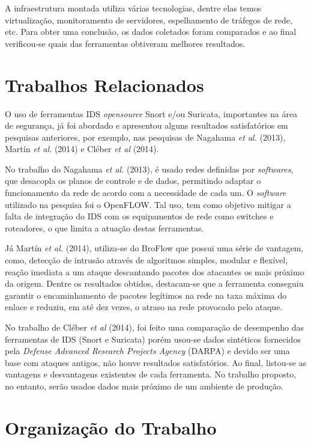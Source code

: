 A infraestrutura montada utiliza várias tecnologias, dentre elas temos virtualização, monitoramento de servidores, espelhamento de tráfegos de rede, etc. Para obter uma conclusão, os dados coletados foram comparados e ao final verificou-se quais das ferramentas obtiveram melhores resultados.

\section{Trabalhos Relacionados} \label{sec:trabalhos-relacionados}

O uso de ferramentas IDS \textit{opensource} Snort e/ou Suricata, importantes na área de segurança, já foi abordado e apresentou alguns resultados satisfatórios em pesquisas anteriores, por exemplo, nas pesquisas de Nagahama \textit{et al.} (2013), Martín \textit{et al.} (2014) e Cléber \textit{et al} (2014).

No trabalho do Nagahama \textit{et al.} (2013), é usado redes definidas por \textit{softwares}, que desacopla os planos de controle e de dados, permitindo adaptar o funcionamento da rede de acordo com a necessidade de cada um. O \textit{software} utilizado na pesquisa foi o OpenFLOW. Tal uso, tem como objetivo mitigar a falta de integração do IDS com os equipamentos de rede como {switches} e roteadores, o que limita a atuação destas ferramentas. 

Já Martín \textit{et al.} (2014), utiliza-se do BroFlow que possui uma série de vantagem, como, detecção de intrusão através de algoritmos simples, modular e flexível, reação imediata a um ataque descantando pacotes dos atacantes os mais próximo da origem. Dentre os resultados obtidos, destacam-se que a ferramenta conseguiu garantir o encaminhamento de pacotes legítimos na rede na taxa máxima do enlace e reduziu, em até dez vezes, o atraso na rede provocado pelo ataque.

No trabalho de Cléber \textit{et al} (2014), foi feito uma comparação de desempenho das ferramentas de IDS (Snort e Suricata) porém usou-se dados sintéticos fornecidos pela \textit{Defense Advanced Research Projects Agency} (DARPA) e devido ser uma base com ataques antigos, não houve resultados satisfatórios. Ao final, listou-se as vantagens e desvantagens existentes de cada ferramenta. No trabalho proposto, no entanto, serão usados dados mais próximo de um ambiente de produção. 

\section{Organização do Trabalho} \label{sec:organização-do-trabalho}

